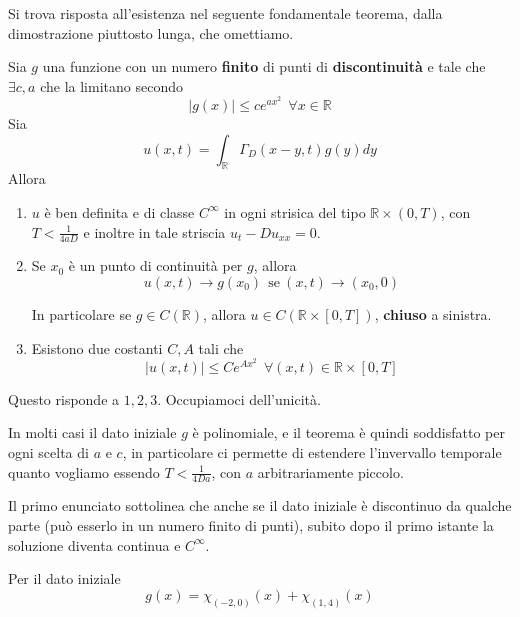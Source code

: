 \documentclass[10pt,a4paper,twoside,openright]{book}
\begin{document}
Si trova risposta all'esistenza nel seguente fondamentale teorema, dalla dimostrazione piuttosto lunga, che omettiamo.
\begin{theorem}
[di Esistenza] Sia $g$ una funzione con un numero \textbf{finito} di punti di \textbf{discontinuità} e tale che $\exists c,a$ che la limitano secondo
\begin{equation}
| g(x)| \leqslant ce^{ax^{2}} \ \ \forall x\in \mathbb{R} \tag{G}
\end{equation}
Sia
\begin{equation*}
u(x,t) =\int _{\mathbb{R}} \Gamma _{D}(x-y,t) g(y) dy
\end{equation*}
Allora
\begin{enumerate}
\item $u$ è ben definita e di classe $C^{\infty }$ in ogni strisica del tipo $\mathbb{R} \times (0,T)$, con $T< \frac{1}{4aD}$ e inoltre in tale striscia $u_{t} -Du_{xx} =0$.
\item Se $x_{0}$ è un punto di continuità per $g$, allora\begin{equation*}
u(x,t)\rightarrow g(x_{0}) \ \ \text{se} \ (x,t)\rightarrow (x_{0},0)
\end{equation*}

In particolare se $g\in C(\mathbb{R})$, allora $u\in C(\mathbb{R} \times [ 0,T])$, \textbf{chiuso} a sinistra.
\item Esistono due costanti $C,A$ tali che\begin{equation*}
| u(x,t)| \leqslant Ce^{Ax^{2}} \ \ \forall (x,t) \in \mathbb{R} \times [ 0,T]
\end{equation*}
\end{enumerate}
\end{theorem}

Questo risponde a $1,2,3$. Occupiamoci dell'unicità.
\begin{oss}
In molti casi il dato iniziale $g$ è polinomiale, e il teorema è quindi soddisfatto per ogni scelta di $a$ e $c$, in particolare ci permette di estendere l'invervallo temporale quanto vogliamo essendo $T< \frac{1}{4Da}$, con $a$ arbitrariamente piccolo.
\end{oss}
\begin{oss}
 Il primo enunciato sottolinea che anche se il dato iniziale è discontinuo da qualche parte (può esserlo in un numero finito di punti), subito dopo il primo istante la soluzione diventa continua e $C^{\infty }$.
\end{oss}
Per il dato iniziale
\begin{equation*}
g(x) =\chi _{(-2,0)}(x) +\chi _{(1,4)}(x)
\end{equation*}
\end{document}
